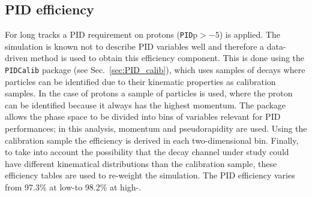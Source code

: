 \subsection{PID efficiency}
\label{sec:PIDeff}
For long tracks a PID requirement on protons (\verb!PID!p$ > -5$) is applied. The simulation is known not to
describe PID variables well and therefore a data-driven method is used to obtain this efficiency component.
This is done using the \verb!PIDCalib! package (see Sec.~\ref{sec:PID_calib}), which uses samples of
decays where particles can be identified due to their kinematic properties as calibration samples. In the case of protons 
a sample of \Lz particles is used, where the proton can be identified because it always has the highest momentum.
The package allows the phase space to be divided into bins of variables relevant for PID
performances; in this analysis, momentum and pseudorapidity are used.
Using the calibration sample the efficiency is derived in each two-dimensional bin.
Finally, to take into account the possibility that the decay channel under study could have different kinematical distributions
than the calibration sample, these efficiency tables are used to re-weight the simulation.
The PID efficiency varies from 97.3\% at low-\qsq to 98.2\% at high-\qsq. 
%



